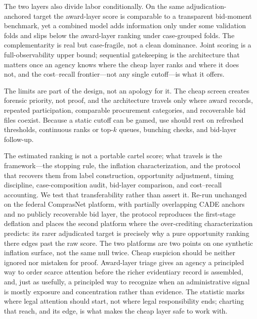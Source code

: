 The two layers also divide labor conditionally. On the same
adjudication-anchored target the award-layer score is comparable to a
transparent bid-moment benchmark, yet a combined model adds
information only under some validation folds and slips below the
award-layer ranking under case-grouped folds. The complementarity is
real but case-fragile, not a clean dominance. Joint scoring is a
full-observability upper bound; sequential gatekeeping is the
architecture that matters once an agency knows where the cheap layer
ranks and where it does not, and the cost--recall frontier---not any
single cutoff---is what it offers.

The limits are part of the design, not an apology for it. The cheap
screen creates forensic priority, not proof, and the architecture
travels only where award records, repeated participation, comparable
procurement categories, and recoverable bid files coexist. Because a
static cutoff can be gamed, use should rest on refreshed thresholds,
continuous ranks or top-$k$ queues, bunching checks, and bid-layer
follow-up.

The estimated ranking is not a portable cartel score; what travels is
the framework---the stopping rule, the inflation characterization, and
the protocol that recovers them from label construction, opportunity
adjustment, timing discipline, case-composition audit, bid-layer
comparison, and cost--recall accounting. We test that transferability
rather than assert it. Re-run unchanged on the federal ComprasNet
platform, with partially overlapping CADE anchors and no publicly
recoverable bid layer, the protocol reproduces the first-stage
deflation and places the second platform where the over-crediting
characterization predicts: its rarer adjudicated target is precisely
why a pure opportunity ranking there edges past the raw score. The two
platforms are two points on one synthetic inflation surface, not the same null
twice. Cheap suspicion should be neither ignored nor
mistaken for proof. Award-layer triage gives an agency a principled
way to order scarce attention before the richer evidentiary record is
assembled, and, just as usefully, a principled way to recognize when
an administrative signal is mostly exposure and concentration rather
than evidence. The statistic marks where legal attention should
start, not where legal responsibility ends; charting that reach, and
its edge, is what makes the cheap layer safe to work with.
